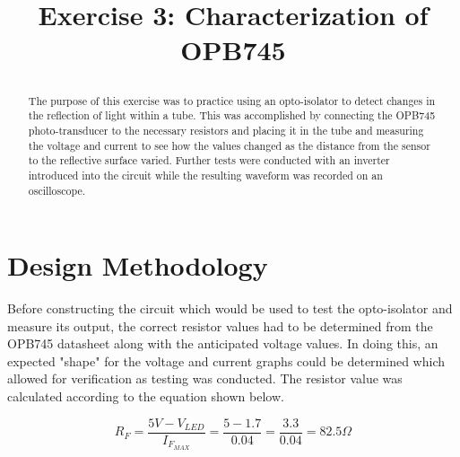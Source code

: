 \documentclass[conference]{IEEEtran}
\begin{document}
\title{Exercise 3: Characterization of OPB745\\

\author{
\and
{}
}
}

\maketitle

\begin{abstract}
The purpose of this exercise was to practice using an opto-isolator to detect changes in the reflection of light within a tube. 
This was accomplished by connecting the OPB745 photo-transducer to the necessary resistors and placing it in the tube and measuring
the voltage and current to see how the values changed as the distance from the sensor to the reflective surface varied. Further tests
were conducted with an inverter introduced into the circuit while the resulting waveform was recorded on an oscilloscope.
\end{abstract}

\section{Design Methodology}

Before constructing the circuit which would be used to test the opto-isolator and measure its output, the correct resistor values
had to be determined from the OPB745 datasheet along with the anticipated voltage values. In doing this, an expected "shape" for the
voltage and current graphs could be determined which allowed for verification as testing was conducted. The resistor value was
calculated according to the equation shown below.

\begin{equation}
    R_F=\frac{5V-V_{LED}}{I_{F_{MAX}}}=\frac{5-1.7}{0.04}=\frac{3.3}{0.04}=82.5\Omega
\end{equation}
\end{document}
